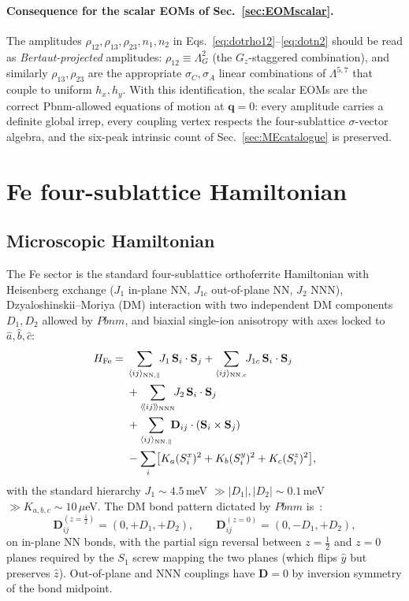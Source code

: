 \documentclass[reprint,amsmath,amssymb,aps,prb,longbibliography]{revtex4-2}
\newcommand{\bfS}{\mathbf{S}}
\newcommand{\bfD}{\mathbf{D}}
\newcommand{\half}{\tfrac{1}{2}}
\begin{document}
\paragraph{Consequence for the scalar EOMs of Sec.~\ref{sec:EOMscalar}.}
The amplitudes $\rho_{12}, \rho_{13}, \rho_{23}, n_1, n_2$ in
Eqs.~\eqref{eq:dotrho12}--\eqref{eq:dotn2} should be read as
\emph{Bertaut-projected} amplitudes:
$\rho_{12}\equiv\Lambda^2_G$ (the $G_z$-staggered combination), and
similarly $\rho_{13},\rho_{23}$ are the appropriate
$\sigma_C, \sigma_A$ linear combinations of $\Lambda^{5,7}$ that couple
to uniform $h_x, h_y$. With this identification, the scalar EOMs are
the correct Pbnm-allowed equations of motion at $\mathbf q=0$: every
amplitude carries a definite global irrep, every coupling vertex
respects the four-sublattice $\sigma$-vector algebra, and the
six-peak intrinsic count of Sec.~\ref{sec:MEcatalogue} is preserved.

\section{Fe four-sublattice Hamiltonian}
\label{sec:Fe}

\subsection{Microscopic Hamiltonian}

The Fe sector is the standard four-sublattice orthoferrite Hamiltonian
with Heisenberg exchange ($J_1$ in-plane NN, $J_{1c}$ out-of-plane NN,
$J_2$ NNN), Dzyaloshinskii--Moriya (DM) interaction with two independent
DM components $D_1, D_2$ allowed by $Pbnm$, and biaxial single-ion
anisotropy with axes locked to $\hat a, \hat b, \hat c$:
\begin{equation}
\begin{aligned}
H_{\rm Fe} =\;& \sum_{\langle ij\rangle_{\rm NN,\parallel}}\!\! J_1\, \bfS_i\cdot\bfS_j
 + \sum_{\langle ij\rangle_{\rm NN,c}}\!\! J_{1c}\,\bfS_i\cdot\bfS_j\\
 &+ \sum_{\langle\!\langle ij\rangle\!\rangle_{\rm NNN}}\!\! J_2\,\bfS_i\cdot\bfS_j\\
 &+ \sum_{\langle ij\rangle_{\rm NN,\parallel}}\!\! \bfD_{ij}\cdot(\bfS_i\times\bfS_j)\\
 &- \sum_i \bigl[K_a (S_i^x)^2 + K_b (S_i^y)^2 + K_c (S_i^z)^2\bigr],
\end{aligned}
\label{eq:HFe}
\end{equation}
with the standard hierarchy $J_1\sim 4.5$\,meV $\gg|D_1|,|D_2|\sim 0.1$\,meV
$\gg K_{a,b,c}\sim 10\,\mu$eV. The DM bond pattern dictated by $Pbnm$
is~\cite{Treves1965,Bertaut1968}:
\begin{equation}
\mathbf D^{(z=\frac{1}{2})}_{ij} = (0,+D_1,+D_2),\qquad
\mathbf D^{(z=0)}_{ij} = (0,-D_1,+D_2),
\label{eq:Dpattern}
\end{equation}
on in-plane NN bonds, with the partial sign reversal between $z=\half$
and $z=0$ planes required by the $S_1$ screw mapping the two planes (which
flips $\hat y$ but preserves $\hat z$). Out-of-plane and NNN couplings
have $\mathbf D=0$ by inversion symmetry of the bond midpoint.
\end{document}
